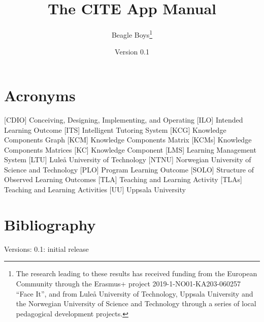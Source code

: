 \def\Version{0.1}

%
\title{The CITE App Manual}
\date{Version \Version}
\author{Beagle Boys\footnote{The research leading to these results has received funding from the European Community through the Erasmus+ project 2019-1-NO01-KA203-060257 ``Face It'', and from Lule{\aa} University of Technology, Uppsala University and the Norwegian University of Science and Technology through a series of local pedagogical development projects.}}
%

\maketitle
\tableofcontents
\newpage

\section*{Acronyms}
\begin{acronym}
				[CDIO]	{Conceiving, Designing, Implementing, and Operating}
				[ILO]	{Intended Learning Outcome}
				[ITS]	{Intelligent Tutoring System}
				[KCG]	{Knowledge Components Graph}
				[KCM]	{Knowledge Components Matrix}
		[KCMs]	{Knowledge Components Matrices}
				[KC]	{Knowledge Component}
				[LMS]	{Learning Management System}
				[LTU]	{Lule{\aa} University of Technology}
				[NTNU]	{Norwegian University of Science and Technology}
				[PLO]	{Program Learning Outcome}
				[SOLO]	{Structure of Observed Learning Outcomes}
				[TLA]	{Teaching and Learning Activity}
		[TLAs]	{Teaching and Learning Activities}
				[UU]	{Uppsala University}
\end{acronym}
\newpage







\appendix
\newpage








\section{Bibliography}




Versions:
0.1: initial release

